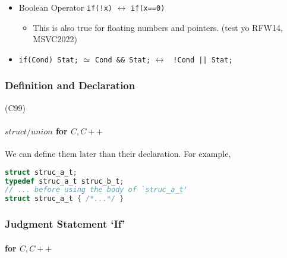 \begin{itemize}
	\item{Boolean Operator \verb|if(!x)| $\leftrightarrow$ \verb|if(x==0)|
		\begin{itemize}\item This is also true for floating numbers and pointers. (test yo RFW14, MSVC2022) \end{itemize}
	}
	
	\item{\verb|if(Cond) Stat;| $\simeq$ \verb|Cond && Stat;| $\leftrightarrow$ \verb# !Cond || Stat; #
	}
\end{itemize}

\subsubsection{Definition and Declaration} (C99)

\paragraph{$struct/union$ for $C,C++$}

We can define them later than their declaration. For example,
\lstset{style=GlobalC}
\begin{lstlisting}[language=C]
struct struc_a_t;
typedef struc_a_t struc_b_t;
// ... before using the body of `struc_a_t'
struct struc_a_t { /*...*/ }
\end{lstlisting}


\subsubsection{Judgment Statement `If'}

\paragraph{for $C,C++$}

















